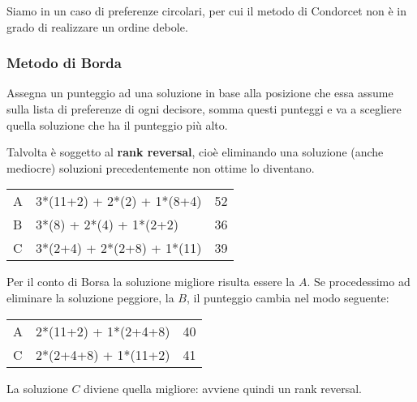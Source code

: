 \documentclass[\main/main.tex]{subfiles}
\begin{document}
Siamo in un caso di preferenze circolari, per cui il metodo di Condorcet non è in grado di realizzare un ordine debole.

\subsubsection*{Metodo di Borda}
Assegna un punteggio ad una soluzione in base alla posizione che essa assume sulla lista di preferenze di ogni decisore, somma questi punteggi e va a scegliere quella soluzione che ha il punteggio più alto.

Talvolta è soggetto al \textbf{rank reversal}, cioè eliminando una soluzione (anche mediocre) soluzioni precedentemente non ottime lo diventano.

\begin{table}
  \begin{tabular}{|L|L|L|}
    \hline
     &                &  \\
    \hline
    A             & 3*(11+2) + 2*(2) + 1*(8+4) & 52               \\
    \hline
    B             & 3*(8) + 2*(4) + 1*(2+2)    & 36               \\
    \hline
    C             & 3*(2+4) + 2*(2+8) + 1*(11) & 39               \\
    \hline
  \end{tabular}
\end{table}

Per il conto di Borsa la soluzione migliore risulta essere la $A$. Se procedessimo ad eliminare la soluzione peggiore, la $B$, il punteggio cambia nel modo seguente:

\begin{table}
  \begin{tabular}{|L|L|L|}
    \hline
     &          &  \\
    \hline
    A             & 2*(11+2) + 1*(2+4+8) & 40               \\
    \hline
    C             & 2*(2+4+8) + 1*(11+2) & 41               \\
    \hline
  \end{tabular}
\end{table}

La soluzione $C$ diviene quella migliore: avviene quindi un rank reversal.
\end{document}
